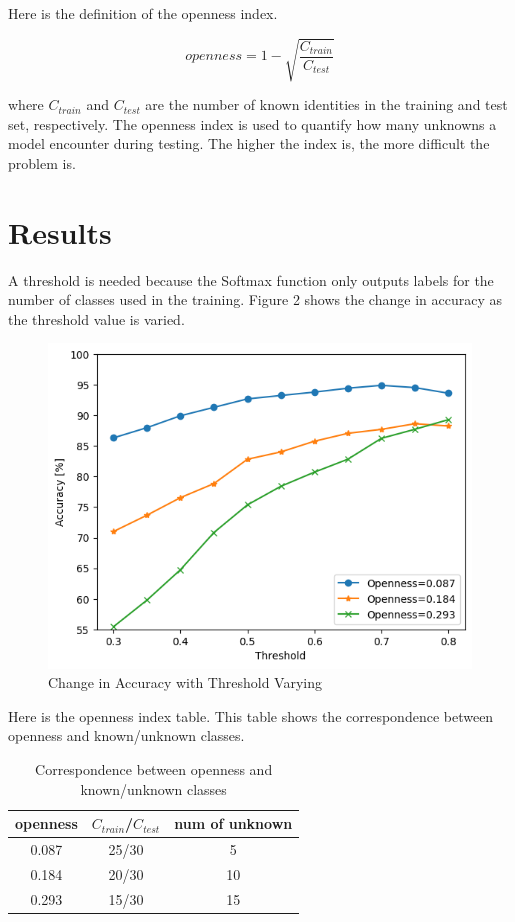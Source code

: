 \documentclass[dvipdfmx]{article}
\begin{document}
Here is the definition of the openness index\cite{Heart signature}. 

\begin{equation}\label{}
openness = 1 - \sqrt{\frac{C_{train}}{C_{test}}}
\end{equation}

where $C_{train}$ and $C_{test}$ are the number of known identities in the training
and test set, respectively. The openness index is used to quantify how
many unknowns a model encounter during testing. The higher the index
is, the more difficult the problem is.

\section{Results}
A threshold is needed because the Softmax function only outputs labels for the number of classes used in the training. Figure 2 shows the change in accuracy as the threshold value is varied.

\begin{figure}[H]
\begin{center}
\includegraphics[width=\linewidth]{./img/openset_graph.png}
\end{center}
\caption{Change in Accuracy with Threshold Varying}
\end{figure}

Here is the openness index table. This table shows the correspondence between openness and known/unknown classes.

\begin{table}[H]
    \caption{Correspondence between openness and known/unknown classes}
    \centering
    \begin{tabular}{|c||c|c|}
    \hline
    openness & $C_{train}$/$C_{test}$ & num of unknown \\ \hline
    0.087 & 25/30 & 5 \\ \hline
    0.184 & 20/30 & 10 \\ \hline
    0.293 & 15/30 & 15 \\ \hline
    \end{tabular}
\end{table}
\end{document}
